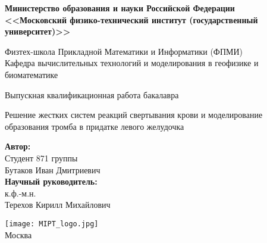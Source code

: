 \begin{center}
    \large\textbf{Министерство образования и науки Российской Федерации \\
    <<Московский физико-технический институт (государственный
    университет)>>} \\
    \vspace{1cm}

    Физтех-школа Прикладной Математики и Информатики (ФПМИ) \\

    Кафедра вычислительных технологий и моделирования в геофизике и биоматематике \\

    \vspace{3em}

    Выпускная квалификационная работа бакалавра
\end{center}

\begin{center}
    \vspace{\fill}
    \LARGE{Решение жестких систем реакций свертывания крови и моделирование образования тромба в придатке левого желудочка}

    \vspace{\fill}
\end{center}


\begin{flushright}
    \textbf{Автор:} \\
    Студент 871 группы \\
    Бутаков Иван Дмитриевич \\
    \vspace{2em}
    \textbf{Научный руководитель:} \\
    к.ф.-м.н. \\
    Терехов Кирилл Михайлович \\
\end{flushright}

\vspace{\fill}

\begin{center}
    \texttt{[image: MIPT\_logo.jpg]}\\
    Москва \the\year{}
\end{center}

\thispagestyle{empty}

\newpage
\setcounter{page}{2}
\fancyfoot[C]{\thepage}
\fancyhead[L]{}
\fancyhead[R]{}
